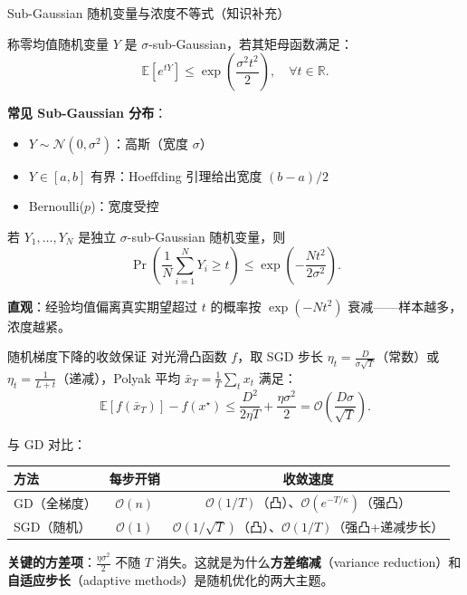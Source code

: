 \documentclass[aspectratio=169,10pt]{ctexbeamer}
\newcommand{\R}{\mathbb{R}}
\newcommand{\E}{\mathbb{E}}
\newcommand{\calN}{\mathcal{N}}
\begin{document}
\begin{frame}{Sub-Gaussian 随机变量与浓度不等式（知识补充）}
\begin{definition}
  称零均值随机变量 $Y$ 是 $\sigma$-sub-Gaussian，若其矩母函数满足：
  \[
    \E[e^{tY}] \le \exp\!\left(\frac{\sigma^2 t^2}{2}\right),\quad \forall t\in\R.
  \]
\end{definition}

\vspace{0.2cm}
\textbf{常见 Sub-Gaussian 分布}：
\begin{itemize}
  \item $Y\sim\calN(0,\sigma^2)$：高斯（宽度 $\sigma$）
  \item $Y\in[a,b]$ 有界：Hoeffding 引理给出宽度 $(b-a)/2$
  \item Bernoulli($p$)：宽度受控
\end{itemize}

\vspace{0.2cm}
\begin{theorem}
  若 $Y_1,\ldots,Y_N$ 是独立 $\sigma$-sub-Gaussian 随机变量，则
  \[
    \Pr\!\left(\frac{1}{N}\sum_{i=1}^N Y_i \ge t\right) \le \exp\!\left(-\frac{N t^2}{2\sigma^2}\right).
  \]
\end{theorem}

\textbf{直观}：经验均值偏离真实期望超过 $t$ 的概率按 $\exp(-N t^2)$ 衰减——样本越多，浓度越紧。
\end{frame}

\begin{frame}{随机梯度下降的收敛保证}
对光滑凸函数 $f$，取 SGD 步长 $\eta_t = \frac{D}{\sigma\sqrt{T}}$（常数）或 $\eta_t = \frac{1}{L+t}$（递减），Polyak 平均 $\bar x_T = \frac1T\sum_t x_t$ 满足：
\[
  \E[f(\bar x_T)] - f(x^\star) \le \frac{D^2}{2\eta T} + \frac{\eta\sigma^2}{2}
  = \mathcal{O}\!\left(\frac{D\sigma}{\sqrt{T}}\right).
\]

\vspace{0.2cm}
与 GD 对比：
\begin{center}
\begin{tabular}{lcc}
\toprule
方法 & 每步开销 & 收敛速度 \\
\midrule
GD（全梯度） & $\mathcal{O}(n)$ & $\mathcal{O}(1/T)$（凸）、$\mathcal{O}(e^{-T/\kappa})$（强凸）\\
SGD（随机） & $\mathcal{O}(1)$ & $\mathcal{O}(1/\sqrt{T})$（凸）、$\mathcal{O}(1/T)$（强凸+递减步长）\\
\bottomrule
\end{tabular}
\end{center}

\textbf{关键的方差项}：$\frac{\eta\sigma^2}{2}$ 不随 $T$ 消失。这就是为什么\textbf{方差缩减}（variance reduction）和\textbf{自适应步长}（adaptive methods）是随机优化的两大主题。
\end{frame}
\end{document}
